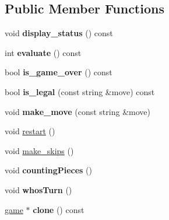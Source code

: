 \subsection*{Public Member Functions}
\begin{DoxyCompactItemize}
\item 
\mbox{\label{classmain__savitch__14_1_1_othello_ab01a4f7aba130133221a11224905e8ce}} 
void {\bfseries display\+\_\+status} () const
\item 
\mbox{\label{classmain__savitch__14_1_1_othello_a57ae44590de8d683592f186ed6bd25b0}} 
int {\bfseries evaluate} () const
\item 
\mbox{\label{classmain__savitch__14_1_1_othello_a540c8b0030e429e0ac30f07e9e8868ec}} 
bool {\bfseries is\+\_\+game\+\_\+over} () const
\item 
\mbox{\label{classmain__savitch__14_1_1_othello_a74ac0d4e6399167037dfc708efdb9033}} 
bool {\bfseries is\+\_\+legal} (const string \&move) const
\item 
\mbox{\label{classmain__savitch__14_1_1_othello_a1066b280efa5cb41039585669282fe06}} 
void {\bfseries make\+\_\+move} (const string \&move)
\item 
void \mbox{\hyperlink{classmain__savitch__14_1_1_othello_abf872b8074bfa4c04119317dc3b39af2}{restart}} ()
\item 
void \mbox{\hyperlink{classmain__savitch__14_1_1_othello_a3177234195a490eef52343d957e64b5d}{make\+\_\+skips}} ()
\item 
\mbox{\label{classmain__savitch__14_1_1_othello_a19f49edfbe82b84922877e00bc854ed8}} 
void {\bfseries counting\+Pieces} ()
\item 
\mbox{\label{classmain__savitch__14_1_1_othello_a21440dbb4511812a76c578a5f546710b}} 
void {\bfseries whos\+Turn} ()
\item 
\mbox{\label{classmain__savitch__14_1_1_othello_a7a5f8495f1a61f6e7b3968e919013c18}} 
\mbox{\hyperlink{classmain__savitch__14_1_1game}{game}} $\ast$ {\bfseries clone} () const

\end{DoxyCompactItemize}
